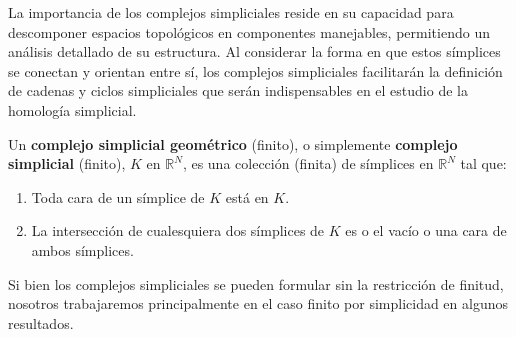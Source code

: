La importancia de los complejos simpliciales reside en su capacidad para
descomponer espacios topológicos en componentes manejables, permitiendo un análisis
detallado de su estructura. Al considerar la forma en que estos símplices se
conectan y orientan entre sí, los complejos simpliciales facilitarán la definición
de cadenas y ciclos simpliciales que serán indispensables en el estudio de la homología
simplicial.

\begin{definicion}
	Un \textbf{complejo simplicial geométrico} (finito), o simplemente \textbf{complejo simplicial} (finito), \(K\) en \(\mathbb{R}^{N}\), es una
	colección (finita) de símplices en \(\mathbb{R}^{N}\) tal que:
	\begin{enumerate}
		\item Toda cara de un símplice de \(K\) está en \(K\).
		
		\item La intersección de cualesquiera dos símplices de \(K\) es o el vacío o
		una cara de ambos símplices.
	\end{enumerate}
\end{definicion}
\begin{nota}
	Si bien los complejos simpliciales se pueden formular sin la restricción de finitud,
	nosotros trabajaremos principalmente en el caso finito por simplicidad en
	algunos resultados.
\end{nota}

